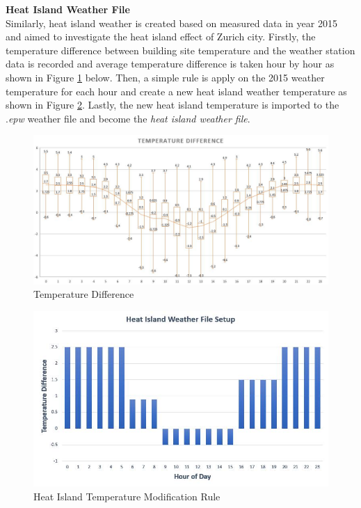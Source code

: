 \documentclass[11pt, a4paper]{article}
\theoremstyle{definition}
\begin{document}
			\textbf{Heat Island Weather File}\\
				Similarly, heat island weather is created based on measured data in year 2015 and aimed to investigate the heat island effect of Zurich city. Firstly, the temperature difference between building site temperature and the weather station data is recorded and average temperature difference is taken hour by hour as shown in Figure \ref{fig:HeatIslandConst} below. Then, a simple rule is apply on the 2015 weather temperature for each hour and create a new heat island weather temperature as shown in Figure \ref{fig:HeatIslandRule}. Lastly, the new heat island temperature is imported to the .\textit{epw} weather file and become the \textit{heat island weather file}.


				\begin{figure}[H]
				\centering
				\includegraphics[scale=0.55]{HeatIsland_Construction.jpg}
				\caption{Temperature Difference}
				\label{fig:HeatIslandConst}
				\end{figure}
				
				\begin{figure}[H]
				\centering
				\includegraphics[scale=0.62]{HeatIslandConstruction.jpg}
				\caption{Heat Island Temperature Modification Rule}
				\label{fig:HeatIslandRule}
				\end{figure}
				
\end{document}
